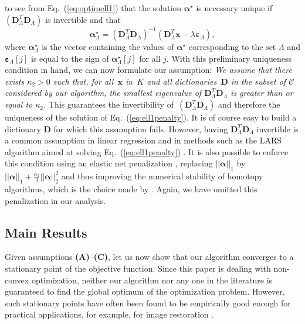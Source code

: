 \documentclass[twoside,11pt]{article}
\def\x{{\mathbf x}}
\def\epsilonb{{\boldsymbol\varepsilon}}
\def\alphab{{\boldsymbol\alpha}}
\def\D{{\mathbf D}}
\def\C{{\mathcal C}}
\begin{document}
to see from Eq.~(\ref{eq:optimell1}) that the solution $\alphab^\star$ is necessary unique
if $(\D_\Lambda^T\D_\Lambda)$ is invertible and that
\begin{equation}
   \alphab^\star_\Lambda =
   (\D_\Lambda^T\D_\Lambda)^{-1}(\D_\Lambda^T\x-\lambda \epsilonb_\Lambda), \label{eq:closed}
\end{equation}
where $\alphab^\star_\Lambda$ is the vector containing the values of $\alphab^\star$ corresponding to the set 
$\Lambda$ and $\epsilonb_\Lambda[j]$ is equal to the sign of $\alphab^\star_\Lambda[j]$ for all $j$. 
With this preliminary uniqueness condition in hand, we can 
now formulate our assumption:
\emph{We assume that there exists $\kappa_2 > 0$ such that, for
all~$\x$ in~$K$ and all dictionaries~$\D$ in the subset of $\C$ considered
by our algorithm, the smallest eigenvalue of $\D_{\Lambda}^T\D_\Lambda$ is
greater than or equal to $\kappa_2$.} 
This guarantees the invertibility of~$(\D_\Lambda^T\D_\Lambda)$ and
therefore the uniqueness of the solution of Eq.~(\ref{eq:ell1penalty}).
It is of course easy to build a
dictionary $\D$ for which this assumption fails.  However, having
$\D_{\Lambda}^T\D_\Lambda$ invertible is a common assumption in
linear regression and in methods such as the LARS algorithm aimed at
solving Eq.~(\ref{eq:ell1penalty}) \citep{efron}. 
It is also possible to enforce this condition using an elastic net
penalization \citep{zou}, replacing $||\alphab||_1$ by
$||\alphab||_1+\frac{\kappa_2}{2}||\alphab||_2^2$ and thus improving the numerical
stability of homotopy algorithms, which is the choice
made by \citet{zou2}. Again, we
have omitted this penalization in our analysis.
\subsection{Main Results}
Given assumptions {\bf (A)}--{\bf (C)}, let us now show that our algorithm
converges to a stationary point of the objective function.  Since this paper
is dealing with non-convex optimization, neither our algorithm nor any one in
the literature is guaranteed to find the global optimum of the optimization
problem. However, such stationary points have often been found to
be empirically good enough for practical applications, for example, for image
restoration \citep{elad,mairal}.
\end{document}
